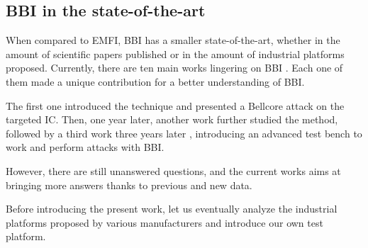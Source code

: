 \subsection{BBI in the state-of-the-art}
	When compared to EMFI, BBI has a smaller state-of-the-art, whether in the amount of scientific papers published or in the amount of industrial platforms proposed.
	Currently, there are ten main works lingering on BBI \cite{bbiOrigin, bbiSecond, bbiThird, bbiColin,japbbi, japbbi2, mybbiCosade, mybbiFdtc2022, mybbifdtc2023, colinFdtc2023}.
	Each one of them made a unique contribution for a better understanding of BBI.

	The first one \cite{bbiOrigin} introduced the technique and presented a Bellcore attack on the targeted IC.
	Then, one year later, another work \cite{bbiSecond} further studied the method, followed by a third work three years later \cite{bbiThird}, introducing an advanced test bench to work and perform attacks with BBI.

	However, there are still unanswered questions, and the current works aims at bringing more answers thanks to previous and new data.

	Before introducing the present work, let us eventually analyze the industrial platforms proposed by various manufacturers and introduce our own test platform.
